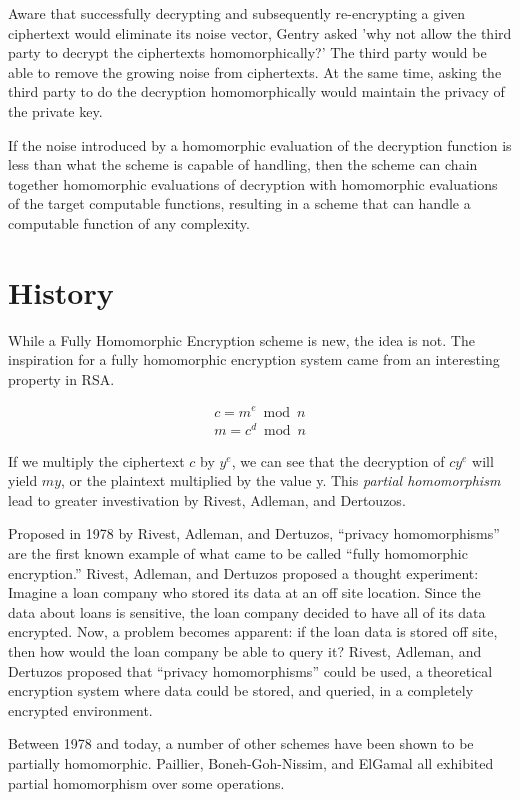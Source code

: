 \documentclass[a4paper,10pt]{article}
\begin{document}
Aware that successfully decrypting and subsequently re-encrypting a
given ciphertext would eliminate its noise vector, Gentry asked 'why
not allow the third party to decrypt the ciphertexts homomorphically?'
The third party would be able to remove the growing noise from
ciphertexts. At the same time, asking the third party to do the
decryption homomorphically would maintain the privacy of the private
key.

If the noise introduced by a homomorphic evaluation of the decryption
function is less than what the scheme is capable of handling, then the
scheme can chain together homomorphic evaluations of decryption with
homomorphic evaluations of the target computable functions, resulting
in a scheme that can handle a computable function of any complexity.

\section{History}
While a Fully Homomorphic Encryption scheme is new, the idea is
not. The inspiration for a fully homomorphic encryption system came
from an interesting property in RSA.

\begin{eqnarray*}
c = m ^{e} \bmod n\\
m = c ^{d} \bmod n 
\end{eqnarray*}

If we multiply the ciphertext $c$ by $y ^{e}$, we can see that the
decryption of $ cy^{e} $ will yield $my$, or the plaintext multiplied
by the value y. This \textit{partial homomorphism} lead to greater
investivation by Rivest, Adleman, and Dertouzos.

Proposed in 1978 by Rivest, Adleman, and Dertuzos, ``privacy
homomorphisms'' are the first known example of what came to be called
``fully homomorphic encryption.'' Rivest, Adleman, and Dertuzos
proposed a thought experiment: Imagine a loan company who stored its
data at an off site location. Since the data about loans is sensitive,
the loan company decided to have all of its data encrypted. Now, a
problem becomes apparent: if the loan data is stored off site, then
how would the loan company be able to query it? Rivest, Adleman, and
Dertuzos proposed that ``privacy homomorphisms'' could be used, a
theoretical encryption system where data could be stored, and queried,
in a completely encrypted environment.

Between 1978 and today, a number of other schemes have been shown to
be partially homomorphic. Paillier, Boneh-Goh-Nissim, and ElGamal all
exhibited partial homomorphism over some operations.
\end{document}
